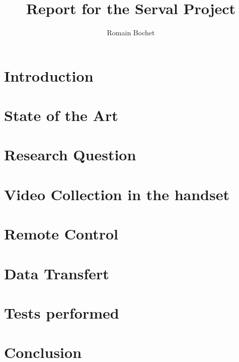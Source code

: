 \documentclass[11pt]{book}
\title{Report for the Serval Project}
\author{Romain Bochet}
\begin{document}
\frontmatter
\maketitle

\tableofcontents

\chapter{Introduction}


\chapter{State of the Art}


\chapter{Research Question}


\chapter{Video Collection in the handset}


\chapter{Remote Control}


\chapter{Data Transfert}


\chapter{Tests performed}


\chapter{Conclusion}



%
\end{document}
